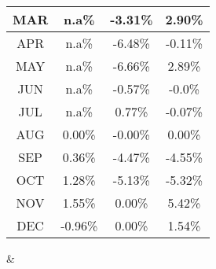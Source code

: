 \documentclass{article}
\begin{document}
\begin{landscape}
\begin{center}
\begin{tabular}
{\begin{tabular}{|c|c|c|c|}
    \rowcolor{lightgray}%
    MAR & n.a\% & -3.31\% & 2.90\%\\%
    \hline%
    \rowcolor{white}%
    APR & n.a\% & -6.48\% & -0.11\%\\%
    \hline%
    \rowcolor{lightgray}%
    MAY & n.a\% & -6.66\% & 2.89\%\\%
    \hline%
    \rowcolor{white}%
    JUN & n.a\% & -0.57\% & -0.0\%\\%
    \hline%
    \rowcolor{lightgray}%
    JUL & n.a\% & 0.77\% & -0.07\%\\%
    \hline%
    \rowcolor{white}%
    AUG & 0.00\% & -0.00\% & 0.00\%\\%
    \hline%
    \rowcolor{lightgray}%
    SEP & 0.36\% & -4.47\% & -4.55\%\\%
    \hline%
    \rowcolor{white}%
    OCT & 1.28\% & -5.13\% & -5.32\%\\%
    \hline%
    \rowcolor{lightgray}%
    NOV & 1.55\% & 0.00\% & 5.42\%\\%
    \hline%
    \rowcolor{white}%
    DEC & -0.96\% & 0.00\% & 1.54\%\\%
    \hline%
    \end{tabular}
}
&
\end{tabular}
\end{center}
\end{landscape}
\end{document}
